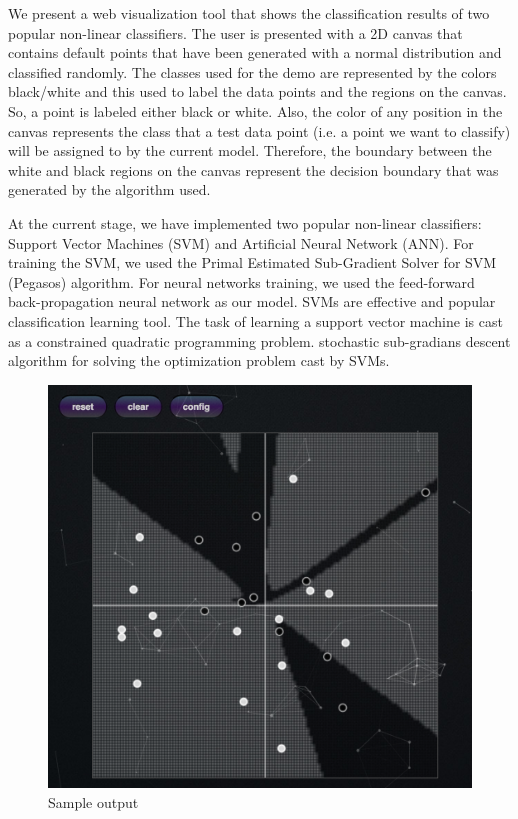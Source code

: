 \documentclass[11pt,letterpaper]{article}
\begin{document}
We present a web visualization tool that shows the classification results of two popular non-linear classifiers. The user is presented with a 2D canvas that contains default points that have been generated with a normal distribution and classified randomly. The classes used for the demo are represented by the colors black/white and this used to label the data points and the regions on the canvas. So, a point is labeled either black or white. Also, the color of any position in the canvas represents the class that a test data point (i.e. a point we want to classify) will be assigned to by the current model. Therefore, the boundary between the white and black regions on the canvas represent the decision boundary that was generated by the algorithm used. 

At the current stage, we have implemented two popular non-linear classifiers: Support Vector Machines (SVM) and Artificial Neural Network (ANN). For training the SVM, we used the Primal Estimated Sub-Gradient Solver for SVM (Pegasos) algorithm. For neural networks training, we used the feed-forward back-propagation neural network as our model. 
SVMs are effective and popular classification learning tool. The task of learning a support vector machine is cast as a constrained quadratic programming problem.  stochastic sub-gradians descent algorithm for solving the optimization problem cast by SVMs.

\begin{figure}
\centering
\includegraphics[scale=.5]{images/Intro.PNG}
\caption{Sample output}
\label{fig:intro}
\end{figure}
\end{document}
